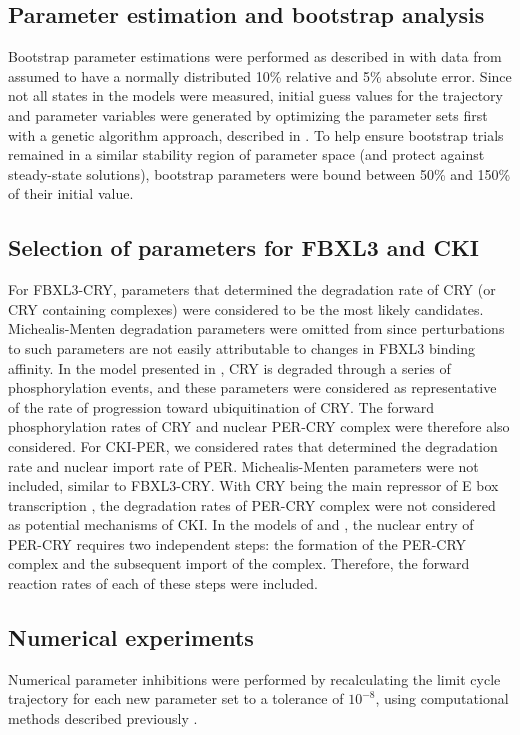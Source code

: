 \subsection{Parameter estimation and bootstrap analysis}
Bootstrap parameter estimations were performed as described in  with data from \cite{Lee2001} assumed to have a normally distributed 10\% relative and 5\% absolute error. 
Since not all states in the models were measured, initial guess values for the trajectory and parameter variables were generated by optimizing the parameter sets first with a genetic algorithm approach, described in \cite{Mirsky2009}. 
To help ensure bootstrap trials remained in a similar stability region of parameter space (and protect against steady-state solutions), bootstrap parameters were bound between 50\% and 150\% of their initial value. 

\subsection{Selection of parameters for FBXL3 and CKI}
For FBXL3-CRY, parameters that determined the degradation rate of CRY (or CRY containing complexes) were considered to be the most likely candidates. 
Michealis-Menten degradation parameters were omitted from  since perturbations to such parameters are not easily attributable to changes in FBXL3 binding affinity. 
In the model presented in \cite{Leloup2003}, CRY is degraded through a series of phosphorylation events, and these parameters were considered as representative of the rate of progression toward ubiquitination of CRY. 
The forward phosphorylation rates of CRY and nuclear PER-CRY complex were therefore also considered. 
 For CKI-PER, we considered rates that determined the degradation rate and nuclear import rate of PER. 
Michealis-Menten parameters were not included, similar to FBXL3-CRY. 
With CRY being the main repressor of E box transcription \cite{Ye2011}, the degradation rates of PER-CRY complex were not considered as potential mechanisms of CKI. 
In the models of \cite{Leloup2003} and \cite{Relogio2011}, the nuclear entry of PER-CRY requires two independent steps: the formation of the PER-CRY complex and the subsequent import of the complex. 
Therefore, the forward reaction rates of each of these steps were included. 

\subsection{Numerical experiments}
Numerical parameter inhibitions were performed by recalculating the limit cycle trajectory for each new parameter set to a tolerance of $10^{-8}$, using computational methods described previously \cite{Wilkins2009}.

